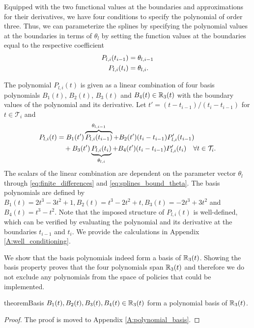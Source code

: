 Equipped with the two functional values at the boundaries and approximations for their derivatives, we have four conditions to specify the polynomial of order three. Thus, we can parameterize the splines by specifying the polynomial values at the boundaries in terms of $\theta_l$ by setting the function values at the boundaries equal to the respective coefficient 
\begin{align}
\label{eq:splines_bound_theta}
P_{l,i}(t_{i-1}) &= \theta_{l, i-1} \\
P_{l,i}(t_{i}) &= \theta_{l,i} \notag.
\end{align}

The polynomial $P_{l,i}(t) $ is given as a linear combination of four basis polynomials  $B_1(t)$, $B_2(t)$, $B_3(t)$ and $B_4(t) \in \mathbb{R}_3(t)$ with the boundary values of the polynomial and its derivative. Let $t' = (t-t_{i-1})/(t_{i} - t_{i-1})$ for $t \in \mathcal{T}_i$ and
\begin{align}
P_{l,i}(t) &= B_1(t') \overbrace{P_{l,i}(t_{i-1})}^{\theta_{l,i-1}} + B_2(t') (t_{i} - t_{i-1}) P'_{l,i}(t_{i-1})  \\& \quad + B_3(t') \underbrace{P_{l,i}(t_{i})}_{\theta_{l,i}} + B_4(t') (t_{i} - t_{i-1}) P'_{l,i}(t_{i}) \quad \forall t \in \mathcal{T}_i. \notag
\end{align}
The scalars of the linear combination are dependent on the parameter vector $\theta_l$ through \eqref{eq:finite_differences} and \eqref{eq:splines_bound_theta}. The basis polynomials are defined by $B_1(t) = 2t^3 - 3t^2 +1, B_2(t) = t^3 - 2t^2 +t, B_3(t) = -2t^3 + 3t^2$ and $B_4(t) = t^3 - t^2$. Note that the imposed structure of $P_{l,i}(t)$ is well-defined, which can be verified by evaluating the polynomial and its derivative at the boundaries $t_{i-1}$ and $t_i$. We provide the calculations in Appendix \ref{A:well_conditioning}.

We show that the basis polynomials indeed form a basis of $\mathbb{R}_3(t)$. Showing the basis property proves that the four polynomials span $\mathbb{R}_3(t)$ and therefore we do not exclude any polynomials from the space of policies that could be implemented.
\begin{restatable}{theorem}{Basis}
$B_1(t), B_2(t), B_3(t), B_4(t) \in \mathbb{R}_3(t)$ form a polynomial basis of $\mathbb{R}_3(t)$.
\end{restatable}
\begin{proof}
The proof is moved to Appendix \ref{A:polynomial_basis}.
\end{proof} 


 

